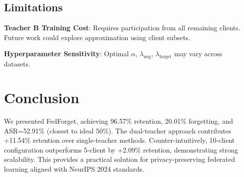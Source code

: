 \documentclass[10pt,twocolumn]{article}
\begin{document}
\subsection{Limitations}

\textbf{Teacher B Training Cost}: Requires participation from all remaining clients. Future work could explore approximation using client subsets.

\textbf{Hyperparameter Sensitivity}: Optimal $\alpha$, $\lambda_{\text{neg}}$, $\lambda_{\text{forget}}$ may vary across datasets.

\section{Conclusion}

We presented FedForget, achieving 96.57\% retention, 20.01\% forgetting, and ASR=52.91\% (closest to ideal 50\%). The dual-teacher approach contributes +11.54\% retention over single-teacher methods. Counter-intuitively, 10-client configuration outperforms 5-client by +2.09\% retention, demonstrating strong scalability. This provides a practical solution for privacy-preserving federated learning aligned with NeurIPS 2024 standards.
\end{document}
